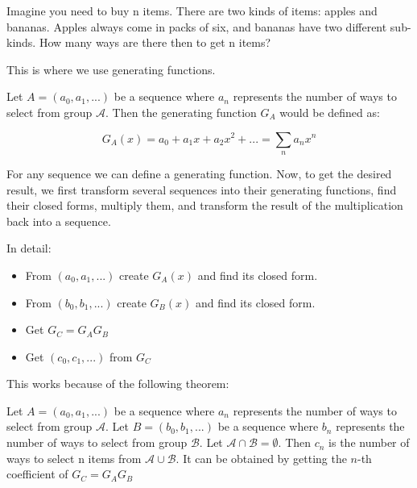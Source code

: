 Imagine you need to buy n items. There are two kinds of items: apples and bananas. Apples always come in packs of six, and bananas have two different sub-kinds. How many ways are there then to get n items?

This is where we use generating functions. 

Let $A = (a_0, a_1, ...)$ be a sequence where $a_n$ represents the number of ways to select from group $\mathcal{A}$. Then the generating function $G_A$ would be defined as: 

$$ G_A (x) = a_0 + a_1 x + a_2 x^2 + ... = \sum_n a_n x^n $$

For any sequence we can define a generating function. Now, to get the desired result, we first transform several sequences into their generating functions, find their closed forms, multiply them, and transform the result of the multiplication back into a sequence. 

In detail: 

\begin{itemize}
    \item From $(a_0, a_1, ...)$ create $G_A(x)$ and find its closed form.
    \item From $(b_0, b_1, ...)$ create $G_B(x)$ and find its closed form.
    \item Get $G_C = G_A G_B$
    \item Get $(c_0, c_1, ...)$ from $G_C$
\end{itemize}

This works because of the following theorem:

\begin{theorem}
    Let $A = (a_0, a_1, ...)$ be a sequence where $a_n$ represents the number of ways to select from group $\mathcal{A}$. Let $B = (b_0, b_1, ...)$ be a sequence where $b_n$ represents the number of ways to select from group $\mathcal{B}$. Let $\mathcal{A} \cap \mathcal{B} = \emptyset$. Then $c_n$ is the number of ways to select n items from $\mathcal{A} \cup \mathcal{B}$. It can be obtained by getting the $n$-th coefficient of $G_C = G_A G_B$
\end{theorem}

